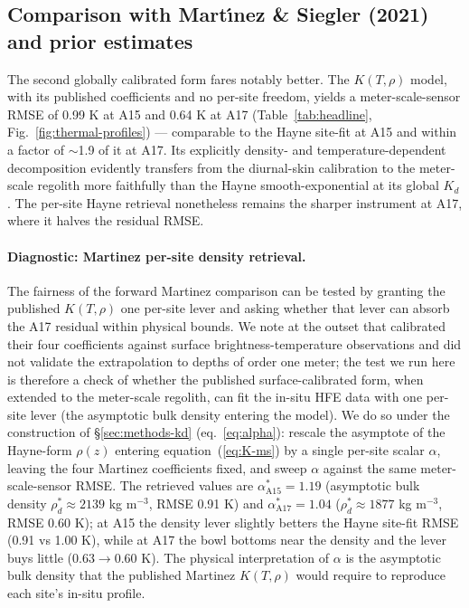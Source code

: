 \documentclass[11pt]{article}
\begin{document}
\subsection{Comparison with Mart{\'\i}nez \& Siegler (2021) and prior estimates}%
\label{sec:disc-prior}
The second globally calibrated
form fares notably better. The \citet{martinez2021} $K(T,\rho)$ model,
with its published coefficients and no per-site freedom, yields a
meter-scale-sensor RMSE of 0.99 K at A15 and 0.64 K at A17
(Table~\ref{tab:headline}, Fig.~\ref{fig:thermal-profiles}) ---
comparable to the Hayne site-fit at A15 and within a factor of
$\sim$1.9 of it at A17. Its explicitly density- and
temperature-dependent decomposition evidently transfers from the
diurnal-skin calibration to the meter-scale regolith more faithfully
than the Hayne smooth-exponential at its global $K_d$. The per-site
Hayne retrieval nonetheless remains the sharper instrument at A17,
where it halves the residual RMSE.

\paragraph*{Diagnostic: Martinez per-site density retrieval.}
The fairness of the forward Martinez comparison can be tested by granting
the published $K(T,\rho)$ one per-site lever and asking whether that lever
can absorb the A17 residual within physical bounds. We note at the outset
that \citet{martinez2021} calibrated their four coefficients against surface
brightness-temperature observations and did not validate the extrapolation
to depths of order one meter; the test we run here is therefore a check of
whether the published surface-calibrated form, when extended to the
meter-scale regolith, can fit the in-situ HFE data with one
per-site lever (the asymptotic bulk density entering the
model). We do so under the construction of \S\ref{sec:methods-kd}
(eq.~\ref{eq:alpha}): rescale the asymptote of the Hayne-form
$\rho(z)$ entering equation~(\ref{eq:K-ms}) by a single per-site scalar
$\alpha$, leaving the four Martinez coefficients fixed, and sweep $\alpha$
against the same meter-scale-sensor RMSE. The
retrieved values are $\alpha^{*}_{\mathrm{A15}}=1.19$
(asymptotic bulk density
$\rho_d^{*}\approx 2139$
kg m$^{-3}$, RMSE 0.91 K) and
$\alpha^{*}_{\mathrm{A17}}=1.04$
($\rho_d^{*}\approx 1877$ kg m$^{-3}$,
RMSE 0.60 K); at A15 the density
lever slightly betters the Hayne site-fit RMSE (0.91 vs 1.00 K), while
at A17 the bowl bottoms near the \citet{hayne2017} density and the
lever buys little ($0.63\rightarrow0.60$ K). The physical interpretation of
$\alpha$ is the asymptotic bulk density that the published
Martinez $K(T,\rho)$ would require to reproduce each site's in-situ profile.
\end{document}
